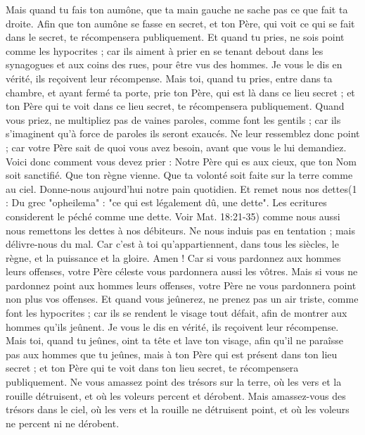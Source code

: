 \begin{multicols}{2}
Mais quand tu fais ton aumône, que ta main gauche ne sache pas ce que fait ta droite.
Afin que ton aumône se fasse en secret, et ton Père, qui voit ce qui se fait dans le secret, te récompensera publiquement.
Et quand tu pries, ne sois point comme les hypocrites ; car ils aiment à prier en se tenant debout dans les synagogues et aux coins des rues, pour être vus des hommes. Je vous le dis en vérité, ils reçoivent leur récompense.
Mais toi, quand tu pries, entre dans ta chambre, et ayant fermé ta porte, prie ton Père, qui est là dans ce lieu secret ; et ton Père qui te voit dans ce lieu secret, te récompensera publiquement.
Quand vous priez, ne multipliez pas de vaines paroles, comme font les gentils ; car ils s'imaginent qu’à force de paroles ils seront exaucés.
Ne leur ressemblez donc point ; car votre Père sait de quoi vous avez besoin, avant que vous le lui demandiez.
Voici donc comment vous devez prier : Notre Père qui es aux cieux, que ton Nom soit sanctifié.
Que ton règne vienne. Que ta volonté soit faite sur la terre comme au ciel.
Donne-nous aujourd'hui notre pain quotidien.
Et remet nous nos dettes(1 : Du grec "opheilema" : "ce qui est légalement dû, une dette". Les ecritures considerent le péché comme une dette. Voir Mat. 18:21-35) comme nous aussi nous remettons les dettes à nos débiteurs.
Ne nous induis pas en tentation ; mais délivre-nous du mal. Car c’est à toi qu’appartiennent, dans tous les siècles, le règne, et la puissance et la gloire. Amen !
Car si vous pardonnez aux hommes leurs offenses, votre Père céleste vous pardonnera aussi les vôtres.
Mais si vous ne pardonnez point aux hommes leurs offenses, votre Père ne vous pardonnera point non plus vos offenses.
Et quand vous jeûnerez, ne prenez pas un air triste, comme font les hypocrites ; car ils se rendent le visage tout défait, afin de montrer aux hommes qu'ils jeûnent. Je vous le dis en vérité, ils reçoivent leur récompense.
Mais toi, quand tu jeûnes, oint ta tête et lave ton visage,
afin qu'il ne paraîsse pas aux hommes que tu jeûnes, mais à ton Père qui est présent dans ton lieu secret ; et ton Père qui te voit dans ton lieu secret, te récompensera publiquement.
Ne vous amassez point des trésors sur la terre, où les vers et la rouille détruisent, et où les voleurs percent et dérobent.
Mais amassez-vous des trésors dans le ciel, où les vers et la rouille ne détruisent point, et où les voleurs ne percent ni ne dérobent.

\end{multicols}
